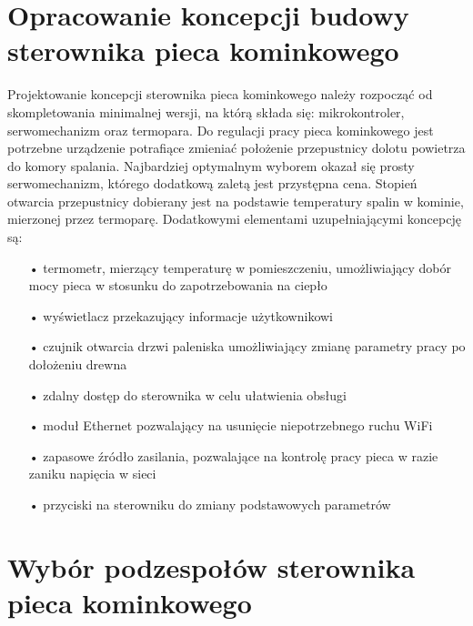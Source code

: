 \documentclass[11pt]{report}
\begin{document}
 \chapter[Opracowanie koncepcji budowy sterownika\\ pieca kominkowego]{Opracowanie koncepcji budowy sterownika pieca kominkowego}\label{ch:koncepcja}
 Projektowanie koncepcji sterownika pieca kominkowego należy rozpocząć od skompletowania minimalnej wersji, na którą składa się: mikrokontroler, serwomechanizm oraz termopara. Do regulacji pracy pieca kominkowego jest potrzebne urządzenie potrafiące zmieniać położenie przepustnicy dolotu powietrza do komory spalania. Najbardziej optymalnym wyborem okazał się prosty serwomechanizm, którego dodatkową zaletą jest przystępna cena. Stopień otwarcia przepustnicy dobierany jest na podstawie temperatury spalin w kominie, mierzonej przez termoparę.
 Dodatkowymi elementami uzupełniającymi koncepcję są:
 \begin{enumerate}
 \item[•] termometr, mierzący temperaturę w pomieszczeniu, umożliwiający dobór mocy pieca w stosunku do zapotrzebowania na ciepło
 \item[•] wyświetlacz przekazujący informacje użytkownikowi
 \item[•] czujnik otwarcia drzwi paleniska umożliwiający zmianę parametry pracy po dołożeniu drewna
 \item[•] zdalny dostęp do sterownika w celu ułatwienia obsługi
 \item[•] moduł Ethernet pozwalający na usunięcie niepotrzebnego ruchu WiFi
 \item[•] zapasowe źródło zasilania, pozwalające na kontrolę pracy pieca w razie zaniku napięcia w sieci
 \item[•] przyciski na sterowniku do zmiany podstawowych parametrów
 \end{enumerate}  
 
  
 \chapter{Wybór podzespołów sterownika pieca kominkowego}\label{ch:wybor}
\end{document}
